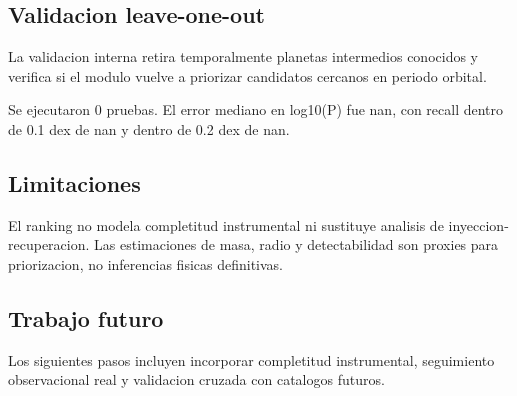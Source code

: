 \subsection{Validacion leave-one-out}

La validacion interna retira temporalmente planetas intermedios conocidos y verifica si el modulo vuelve a priorizar candidatos cercanos en periodo orbital.

Se ejecutaron 0 pruebas. El error mediano en log10(P) fue nan, con recall dentro de 0.1 dex de nan y dentro de 0.2 dex de nan.

\subsection{Limitaciones}

El ranking no modela completitud instrumental ni sustituye analisis de inyeccion-recuperacion. Las estimaciones de masa, radio y detectabilidad son proxies para priorizacion, no inferencias fisicas definitivas.

\subsection{Trabajo futuro}

Los siguientes pasos incluyen incorporar completitud instrumental, seguimiento observacional real y validacion cruzada con catalogos futuros.

